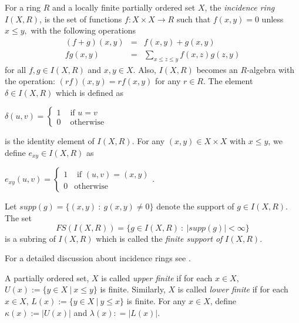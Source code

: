 \documentclass[12pt]{article}
\begin{document}
For a ring $R$ and a locally finite partially ordered set $X$, the 
\textit{incidence ring} $I(X,R)$, is the set of functions $f:X\times
X\rightarrow R$ such that $f(x,y)=0$ unless $x\leq y,$ with the following
operations 
\begin{eqnarray*}
(f+g)(x,y) &=&f(x,y)+g(x,y) \\
fg(x,y) &=&\sum\limits_{x\leq z\leq y}f(x,z)g(z,y)
\end{eqnarray*}
for all $f,g\in I(X,R)$ and $x,y\in X.$ Also, $I(X,R)$ becomes an $R$-algebra with the operation: \newline
$(rf)(x,y)=rf(x,y)$ for any $r\in R.$ %
The element $\delta \in I(X,R)$ which is defined as

\begin{center}
$\delta (u,v)=\left\{ 
\begin{array}{cc}
1 & \text{ if }u=v \\ 
0 & \text{ otherwise }%
\end{array}
\right. $
\end{center}
is the identity element of $I(X,R)$. For any $(x,y)\in X\times X$ with $x\leq y$, we define $e_{xy}\in I(X,R)$ as

\begin{center}
$e_{xy}(u,v)=\left\{ 
\begin{array}{cc}
1 & \text{ if }(u,v)=(x,y) \\ 
0 & \text{otherwise }%
\end{array}
\right. .$
\end{center}

Let $supp(g) =\{ (x,y) ~:~ g(x,y)\neq 0\} $ denote the support of $g\in
I(X,R)$. The set 
\begin{equation*}
FS(I(X,R))= \{ g \in I(X,R) ~:~ |supp(g)| < \infty \}
\end{equation*}
is a subring of $I(X,R)$ which is called the \textit{finite support of} $%
I(X,R)$.

For a detailed discussion about incidence rings see
\cite{SO:IncAlg}.


A partially ordered set, $X$ is called \textit{upper finite} if for each $%
x\in X,$ $U(x):=\{y\in X~|~x \leq y\}$ is finite. Similarly, $X$ is called 
\textit{lower finite} if for each $x\in X$, $L(x):=\{y\in X~|~y \leq x\}$ is
finite. For any $x \in X$, define $\kappa(x):= |U(x)|$ and $\lambda(x) : =
|L(x)|$.
\end{document}
